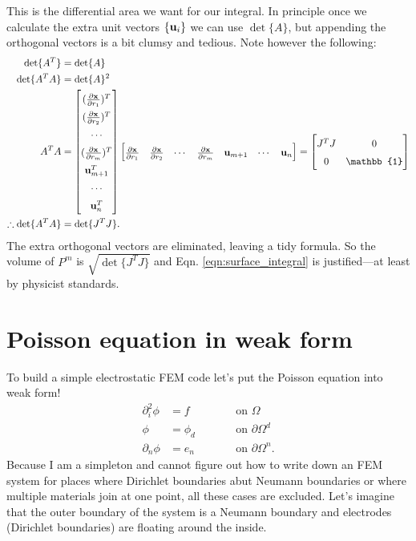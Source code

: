 %
This is the differential area we want for our integral.  In principle once we calculate the extra unit vectors $\{\textbf{u}_i\}$ we can use $\det \{ A \}$, but appending the orthogonal vectors is a bit clumsy and tedious.  Note however the following:
%
\begin{equation}
\begin{aligned}
\renewcommand\arraystretch{1.5}
\det \{A^T \} &= \det \{ A \} \\
\det \{A^T A \} &= \det \{ A \} ^2 \\
A^T A &=
\begin{bmatrix}
(\pp{\ve x}{r_1})^T \\
(\pp{\ve x}{r_2})^T \\
\cdots \\
(\pp{\ve x}{r_m})^T \\
\ve u_{m+1}^T \\
\cdots \\
\ve u_n^T
\end{bmatrix}
\begin{bmatrix}
\pp{\ve x}{r_1} &
\pp{\ve x}{r_2} &
\cdots &
\pp{\ve x}{r_m} &
\ve u_{m+1} &
\cdots &
\ve u_n
\end{bmatrix}
=
\begin{bmatrix}
J^T J & 0 \\ 0 & \mathbb{1}
\end{bmatrix} \\
\therefore \det \{ A^T A \} &= \det \{ J^T J \}.
\end{aligned}
\end{equation}
%
The extra orthogonal vectors are eliminated, leaving a tidy formula.  So the volume of $P^m$ is $\sqrt{ \det \{ J^T J \} }$ and Eqn. \ref{eqn:surface_integral} is justified---at least by physicist standards.

\section{Poisson equation in weak form}

To build a simple electrostatic FEM code let's put the Poisson equation into weak form!
%
\begin{equation}
\begin{aligned}
\partial_i^2 \phi &= f \qquad &&\textrm{on $\Omega$} \\
\phi &= \phi_d \qquad &&\textrm{on $\partial \Omega^d$} \\
\partial_n \phi &= e_n \qquad &&\textrm{on $\partial \Omega^n$.}
\end{aligned}
\end{equation}
%
Because I am a simpleton and cannot figure out how to write down an FEM system for places where Dirichlet boundaries abut Neumann boundaries or where multiple materials join at one point, all these cases are excluded.  Let's imagine that the outer boundary of the system is a Neumann boundary and electrodes (Dirichlet boundaries) are floating around the inside.

